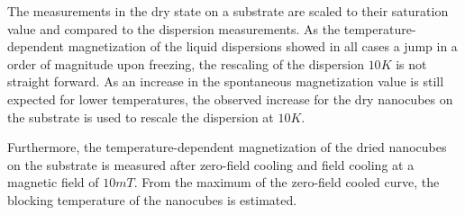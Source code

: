 \documentclass[\main/dresen_thesis.tex]{subfiles}
\begin{document}
    The measurements in the dry state on a substrate are scaled to their saturation value and compared to the dispersion measurements.
    As the temperature-dependent magnetization of the liquid dispersions showed in all cases a jump in a order of magnitude upon freezing, the rescaling of the dispersion $10 \unit{K}$ is not straight forward.
    As an increase in the spontaneous magnetization value is still expected for lower temperatures, the observed increase for the dry nanocubes on the substrate is used to rescale the dispersion at $10 \unit{K}$.

    Furthermore, the temperature-dependent magnetization of the dried nanocubes on the substrate is measured after zero-field cooling and field cooling at a magnetic field of $10 \unit{mT}$.
    From the maximum of the zero-field cooled curve, the blocking temperature of the nanocubes is estimated.
\end{document}
